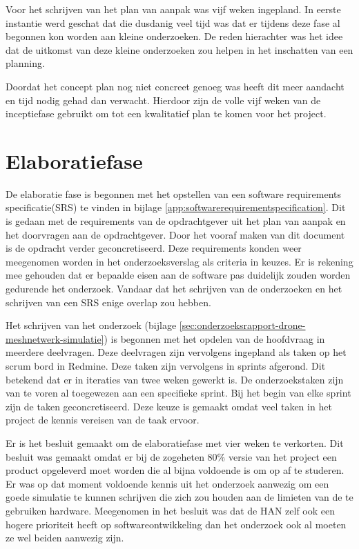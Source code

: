 \documentclass[a4paper, 11pt, oneside]{report}
\begin{document}
Voor het schrijven van het plan van aanpak was vijf weken ingepland. 
In eerste instantie werd geschat dat die dusdanig veel tijd was dat er tijdens deze fase al begonnen kon worden aan kleine onderzoeken.
De reden hierachter was het idee dat de uitkomst van deze kleine onderzoeken zou helpen in het inschatten van een planning.

Doordat het concept plan nog niet concreet genoeg was heeft dit meer aandacht en tijd nodig gehad dan verwacht. 
Hierdoor zijn de volle vijf weken van de inceptiefase gebruikt om tot een kwalitatief plan te komen voor het project.

\section{Elaboratiefase}\label{sec:elaboratiefase}

De elaboratie fase is begonnen met het opstellen van een software requirements specificatie(SRS) te vinden in bijlage \ref{app:softwarerequirementspecification}.
Dit is gedaan met de requirements van de opdrachtgever uit het plan van aanpak en het doorvragen aan de opdrachtgever.
Door het vooraf maken van dit document is de opdracht verder geconcretiseerd.
Deze requirements konden weer meegenomen worden in het onderzoeksverslag als criteria in keuzes.  
Er is rekening mee gehouden dat er bepaalde eisen aan de software pas duidelijk zouden worden gedurende het onderzoek.
Vandaar dat het schrijven van de onderzoeken en het schrijven van een SRS enige overlap zou hebben. 

Het schrijven van het onderzoek  (bijlage \ref{sec:onderzoeksrapport-drone-meshnetwerk-simulatie}) is begonnen met het opdelen van de hoofdvraag in meerdere deelvragen. 
Deze deelvragen zijn vervolgens ingepland als taken op het scrum bord in Redmine.
Deze taken zijn vervolgens in sprints afgerond. 
Dit betekend dat er in iteraties van twee weken gewerkt is. 
De onderzoekstaken zijn van te voren al toegewezen aan een specifieke sprint.
Bij het begin van elke sprint zijn de taken geconcretiseerd.
Deze keuze is gemaakt omdat  veel taken in het project de kennis vereisen van de taak ervoor.


Er is het besluit gemaakt om de elaboratiefase met vier weken te verkorten. 
Dit besluit was gemaakt omdat er bij de zogeheten 80\% versie van het project een product opgeleverd moet worden die al bijna voldoende is om op af te studeren. 
Er was op dat moment voldoende kennis uit het onderzoek aanwezig om een goede simulatie te kunnen schrijven die zich zou houden aan de limieten van de te gebruiken hardware. 
Meegenomen in het besluit was dat de HAN zelf ook een hogere prioriteit heeft op softwareontwikkeling dan het onderzoek ook al moeten ze wel beiden aanwezig zijn.
\end{document}
